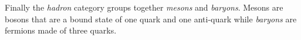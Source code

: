 Finally the \emph{hadron} category groups together \emph{mesons} and
\emph{baryons}. Mesons are bosons that are a bound state of one quark and one
anti-quark while \emph{baryons} are fermions made of three quarks.




